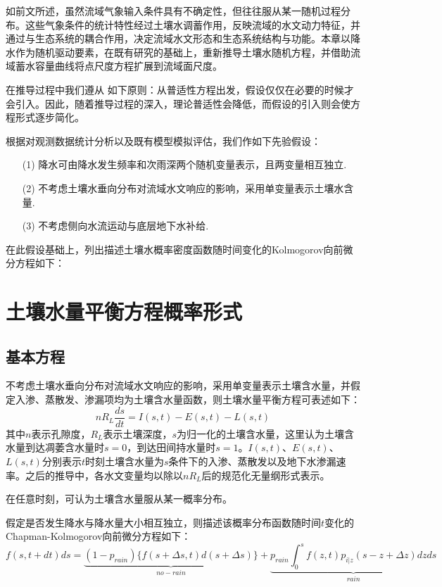 如前文所述，虽然流域气象输入条件具有不确定性，但往往服从某一随机过程分布。这些气象条件的统计特性经过土壤水调蓄作用，反映流域的水文动力特征，并通过与生态系统的耦合作用，决定流域水文形态和生态系统结构与功能。本章以降水作为随机驱动要素，在既有研究的基础上，重新推导土壤水随机方程，并借助流域蓄水容量曲线将点尺度方程扩展到流域面尺度。
\fi

在推导过程中我们遵从
如下原则：从普适性方程出发，假设仅仅在必要的时候才会引入。因此，随着推导过程的深入，理论普适性会降低，而假设的引入则会使方程形式逐步简化。


根据对观测数据统计分析以及既有模型模拟评估，我们作如下先验假设：

\begin{itemize}
\item[(1)]降水可由降水发生频率和次雨深两个随机变量表示，且两变量相互独立.
\item[(2)]不考虑土壤水垂向分布对流域水文响应的影响，采用单变量表示土壤水含量.
\item[(3)]不考虑侧向水流运动与底层地下水补给.
\end{itemize}

在此假设基础上，列出描述土壤水概率密度函数随时间变化的Kolmogorov向前微分方程如下：
\fi
\section{土壤水量平衡方程概率形式}
\subsection{基本方程}
不考虑土壤水垂向分布对流域水文响应的影响，采用单变量表示土壤含水量，并假定入渗、蒸散发、渗漏项均为土壤含水量函数，则土壤水量平衡方程可表述如下：
\begin{equation}
\label{sbalance}
nR_{L}\frac{ds}{dt}=I(s,t)-E(s,t)-L(s,t)
\end{equation}
其中$n$表示孔隙度，$R_{L}$表示土壤深度，$s$为归一化的土壤含水量，这里认为土壤含水量到达凋萎含水量时$s=0$，到达田间持水量时$s=1$。$I(s,t)$、$E(s,t)$、$L(s,t)$分别表示$t$时刻土壤含水量为$s$条件下的入渗、蒸散发以及地下水渗漏速率。之后的推导中，各水文变量均以除以$nR_L$后的规范化无量纲形式表示。

在任意时刻，可认为土壤含水量服从某一概率分布。
\iffalse
由于有持续干旱或持续降水的可能性，该分布应当为离散-连续混合分布，即归一化的土壤水含水量以一定概率处于0值或1值，以一定概率密度分布处于$(0,1)$区间。


首先考虑$s \in (0,1)$时概率密度分布函数。
\fi
假定是否发生降水与降水量大小相互独立，则描述该概率分布函数随时间$t$变化的Chapman-Kolmogorov向前微分方程如下：
\begin{equation}
\label{basic1}
f(s,t+dt)ds= \underbrace{(1-p_{rain})\Bigg \{ f(s+\Delta s,t)d(s+\Delta s) \Bigg \} }_{no-rain} +\underbrace{p_{rain} \int_{0}^{s} f(z,t)p_{i|z}(s-z+\Delta z)dzds}_{rain}
\end{equation}

